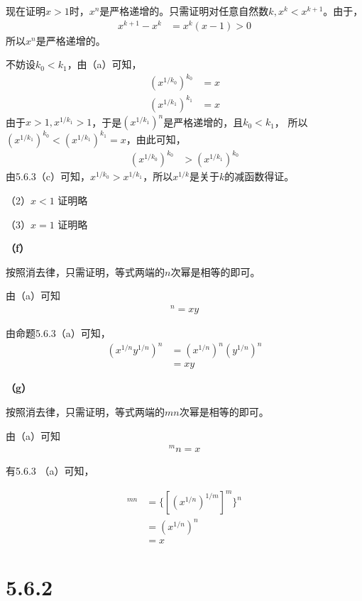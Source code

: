 \documentclass{article}
\theoremstyle{mystyle}
\begin{document}
现在证明$x>1$时，$x^n$是严格递增的。只需证明对任意自然数$k, x^k < x^{k+1}$。由于，
\begin{align*}
  x^{k+1} - x^k & = x^k(x-1) > 0
\end{align*}
所以$x^n$是严格递增的。

不妨设$k_0 < k_1$，由（a）可知，
\begin{align}
  (x^{1/k_0})^{k_0} & = x \\
  (x^{1/k_1})^{k_1} & = x
\end{align}
由于$x>1, x^{1/k_1} > 1$，于是$(x^{1/k_1})^n$是严格递增的，且$k_0<k_1$，
所以$(x^{1/k_1})^{k_0} < (x^{1/k_1})^{k_1}=x$，由此可知，
\begin{align}
  (x^{1/k_0})^{k_0} & > (x^{1/k_1})^{k_0}
\end{align}
由5.6.3（c）可知，$x^{1/k_0} > x^{1/k_1}$，所以$x^{1/k}$是关于$k$的减函数得证。

（2）$x<1$ 证明略

（3）$x=1$ 证明略

\textbf{（f）}

按照消去律，只需证明，等式两端的$n$次幂是相等的即可。

由（a）可知
\begin{align*}
  [(xy)^{1/n}]^n = xy
\end{align*}

由命题5.6.3（a）可知，
\begin{align*}
  (x^{1/n}y^{1/n})^n & = (x^{1/n})^n  (y^{1/n})^n \\
                     & = xy
\end{align*}

\textbf{（g）}

按照消去律，只需证明，等式两端的$mn$次幂是相等的即可。

由（a）可知
\begin{align*}
  [(x)^{1/mn}]^mn = x
\end{align*}

有5.6.3 （a）可知，

\begin{align*}
  [(x^{1/n})^{1/m}]^{mn} & = \{[(x^{1/n})^{1/m}]^m\}^n \\
                         & = (x^{1/n})^n               \\
                         & = x
\end{align*}

\section*{5.6.2}
\end{document}
